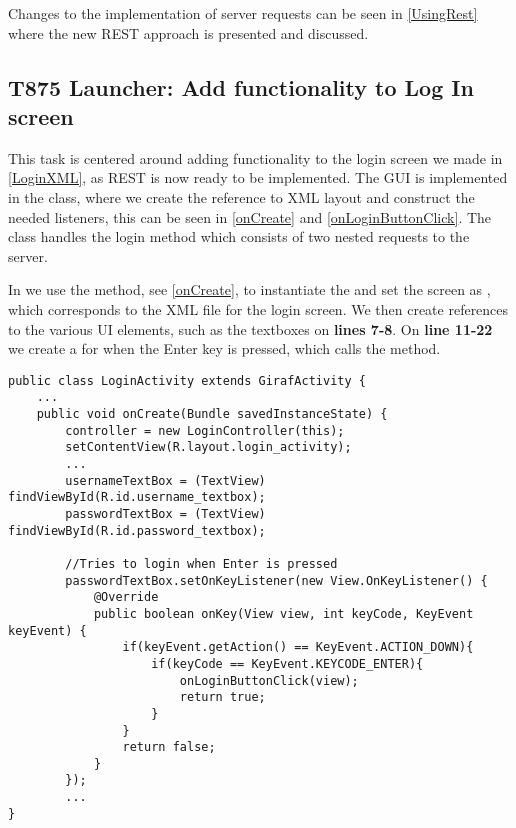 Changes to the implementation of server requests can be seen in
\autoref{UsingRest} where the new REST approach is presented and discussed.


\subsection{T875 Launcher: Add functionality to Log In screen}

This task is centered around adding functionality to the login screen we made
in \autoref{LoginXML}, as REST is now ready to be implemented. The GUI is
implemented in the  class, where we create the reference
to XML layout and construct the needed listeners, this can be seen in
\autoref{onCreate} and \autoref{onLoginButtonClick}. The 
class handles the login method which consists of two nested requests to the
server.\nl

In  we use the  method, see
\autoref{onCreate}, to instantiate the  and set the
screen as , which corresponds to the XML
file for the login screen. We then create references to the various UI elements,
such as the textboxes on \textbf{lines 7-8}. On \textbf{line 11-22} we create a
 for when the Enter key is pressed, which calls the
 method.\nl

\begin{minipage}[H]{\linewidth}
\begin{lstlisting}[caption = Creating the correct references when logging in,
label = onCreate] public class LoginActivity extends GirafActivity {
	...
	public void onCreate(Bundle savedInstanceState) {
		controller = new LoginController(this);
    	setContentView(R.layout.login_activity);
		...
        usernameTextBox = (TextView) findViewById(R.id.username_textbox);
        passwordTextBox = (TextView) findViewById(R.id.password_textbox);
        
        //Tries to login when Enter is pressed
        passwordTextBox.setOnKeyListener(new View.OnKeyListener() {
            @Override
            public boolean onKey(View view, int keyCode, KeyEvent keyEvent) {
                if(keyEvent.getAction() == KeyEvent.ACTION_DOWN){
                    if(keyCode == KeyEvent.KEYCODE_ENTER){
                        onLoginButtonClick(view);
                        return true;
                    }
                }
                return false;
            }
        });
        ...
}
\end{lstlisting}
\end{minipage}

